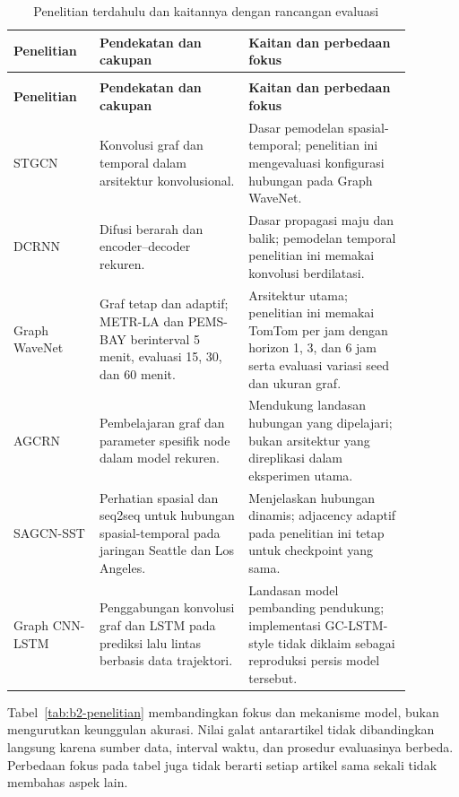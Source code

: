 \begingroup
\small
\renewcommand{\arraystretch}{1.15}
\begin{longtable}{>{\raggedright\arraybackslash}p{0.19\linewidth}>{\raggedright\arraybackslash}p{0.33\linewidth}>{\raggedright\arraybackslash}p{0.36\linewidth}}
\caption{Penelitian terdahulu dan kaitannya dengan rancangan evaluasi}\label{tab:b2-penelitian}\label{tab:penelitian_terdahulu}\\
\hline
\textbf{Penelitian} & \textbf{Pendekatan dan cakupan} & \textbf{Kaitan dan perbedaan fokus} \\
\hline
\endfirsthead
\multicolumn{3}{l}{\small Tabel \thetable\ (lanjutan)}\\
\hline
\textbf{Penelitian} & \textbf{Pendekatan dan cakupan} & \textbf{Kaitan dan perbedaan fokus} \\
\hline
\endhead
STGCN \cite{yu2018stgcn} & Konvolusi graf dan temporal dalam arsitektur konvolusional. & Dasar pemodelan spasial-temporal; penelitian ini mengevaluasi konfigurasi hubungan pada Graph WaveNet. \\
DCRNN \cite{li2018dcrnn} & Difusi berarah dan encoder--decoder rekuren. & Dasar propagasi maju dan balik; pemodelan temporal penelitian ini memakai konvolusi berdilatasi. \\
Graph WaveNet \cite{wu2019graphwavenet} & Graf tetap dan adaptif; METR-LA dan PEMS-BAY berinterval 5 menit, evaluasi 15, 30, dan 60 menit. & Arsitektur utama; penelitian ini memakai TomTom per jam dengan horizon 1, 3, dan 6 jam serta evaluasi variasi seed dan ukuran graf. \\
AGCRN \cite{bai2020agcrn} & Pembelajaran graf dan parameter spesifik node dalam model rekuren. & Mendukung landasan hubungan yang dipelajari; bukan arsitektur yang direplikasi dalam eksperimen utama. \\
SAGCN-SST \cite{zheng2022dynamic} & Perhatian spasial dan seq2seq untuk hubungan spasial-temporal pada jaringan Seattle dan Los Angeles. & Menjelaskan hubungan dinamis; adjacency adaptif pada penelitian ini tetap untuk checkpoint yang sama. \\
Graph CNN-LSTM \cite{bogaerts2020graphcnn} & Penggabungan konvolusi graf dan LSTM pada prediksi lalu lintas berbasis data trajektori. & Landasan model pembanding pendukung; implementasi GC-LSTM-style tidak diklaim sebagai reproduksi persis model tersebut. \\
\hline
\end{longtable}
\endgroup

Tabel~\ref{tab:b2-penelitian} membandingkan fokus dan mekanisme model, bukan mengurutkan keunggulan akurasi. Nilai galat antarartikel tidak dibandingkan langsung karena sumber data, interval waktu, dan prosedur evaluasinya berbeda. Perbedaan fokus pada tabel juga tidak berarti setiap artikel sama sekali tidak membahas aspek lain.

